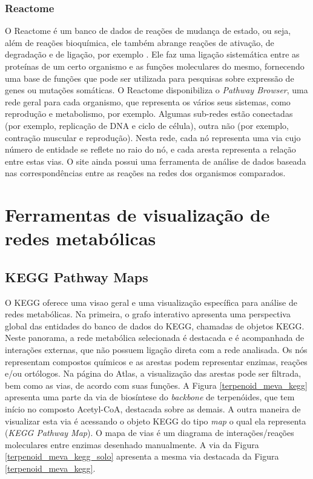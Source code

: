 \documentclass[conference]{IEEEtran}
\begin{document}
\subsubsection{Reactome}
\indent O Reactome é um banco de dados de reações de mudança de estado, ou seja, além de reações bioquímica, ele também abrange reações de ativação, de degradação e de ligação, por exemplo \cite{reactomeUsersguide}. Ele faz uma ligação sistemática entre as proteínas de um certo organismo e as funções moleculares do mesmo, fornecendo uma base de funções que pode ser utilizada para pesquisas sobre expressão de genes ou mutações somáticas. O Reactome disponibiliza o \textit{Pathway Browser}, uma rede geral para cada organismo, que representa os vários seus sistemas, como reprodução e metabolismo, por exemplo. Algumas sub-redes estão conectadas (por exemplo, replicação de DNA e ciclo de célula), outra não (por exemplo, contração muscular e reprodução). Nesta rede, cada nó representa uma via cujo número de entidade se reflete no raio do nó, e cada aresta representa a relação entre estas vias. O site ainda possui uma ferramenta de análise de dados baseada nas correspondências entre as reações na redes dos organismos comparados.

\section{Ferramentas de visualização de redes metabólicas}

\subsection{KEGG Pathway Maps}

\indent O KEGG oferece uma visao geral e uma visualização específica para análise de redes metabólicas. Na primeira, o grafo interativo apresenta uma perspectiva global das entidades do banco de dados do KEGG, chamadas de objetos KEGG. Neste panorama, a rede metabólica selecionada é destacada e é acompanhada de interações externas, que não possuem ligação direta com a rede analisada. Os nós representam compostos químicos e as arestas podem representar enzimas, reações e/ou ortólogos. Na página do Atlas, a visualização das arestas pode ser filtrada, bem como as vias, de acordo com suas funções. A Figura \ref{terpenoid_meva_kegg} apresenta uma parte da via de biosíntese do \textit{backbone} de terpenóides, que tem início no composto Acetyl-CoA, destacada sobre as demais. A outra maneira de visualizar esta via é acessando o objeto KEGG do tipo \textit{map} o qual ela representa (\textit{KEGG Pathway Map}). O mapa de vias é um diagrama de interações/reações moleculares entre enzimas desenhado manualmente. A via da Figura \ref{terpenoid_meva_kegg_solo} apresenta a mesma via destacada da Figura \ref{terpenoid_meva_kegg}. \\
\end{document}
